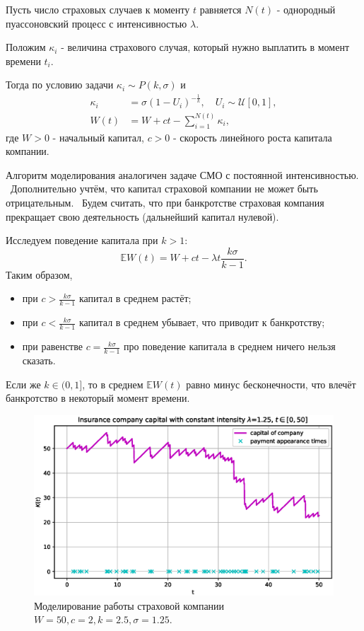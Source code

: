 \documentclass[11pt]{report}
\begin{document}
Пусть число страховых случаев к моменту $t$ равняется $N(t)$ - однородный пуассоновский процесс с интенсивностью $\lambda$.

Положим $\kappa_i$ - величина страхового случая, который нужно выплатить в момент времени $t_i$.

Тогда по условию задачи $\kappa_i\sim P(k,\sigma)$ и 
$$
\begin{aligned}
\kappa_i &= \sigma(1 - U_i)^{-\frac{1}{k}},\quad U_i\sim\mathcal{U}[0,1], \\
W(t) &= W + ct - \sum^{N(t)}_{i=1}\kappa_i,
\end{aligned}
$$
где $W>0$ - начальный капитал, $c>0$ - скорость линейного роста капитала компании.

Алгоритм моделирования аналогичен задаче СМО с постоянной интенсивностью. \
Дополнительно учтём, что капитал страховой компании не может быть отрицательным. \
Будем считать, что при банкротстве страховая компания прекращает свою деятельность (дальнейший капитал нулевой).

Исследуем поведение капитала при $k>1$:
$$
\mathbb{E}W(t) = W + ct - \lambda t \frac{k\sigma}{k-1}.
$$
Таким образом,
\begin{itemize}
\item при $c > \frac{k\sigma}{k-1}$ капитал в среднем растёт;
\item при $c < \frac{k\sigma}{k-1}$ капитал в среднем убывает, что приводит к банкротству;
\item при равенстве $c = \frac{k\sigma}{k-1}$ про поведение капитала в среднем ничего нельзя сказать.
\end{itemize}

Если же $k\in(0,1]$, то в среднем $\mathbb{E}W(t)$ равно минус бесконечности, что влечёт банкротство в некоторый момент времени.

\begin{figure}[H]
    \centering
    \includegraphics[width=0.9\linewidth]{images/insurance-constant.eps}
    \caption{Моделирование работы страховой компании $W=50,c=2,k=2.5,\sigma=1.25$.}
    \label{fig:insurance-constant}
\end{figure}
\end{document}
